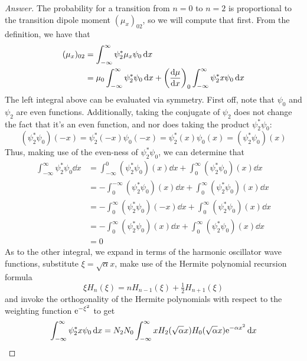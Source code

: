 \documentclass[../psets.tex]{subfiles}
\begin{document}
\begin{enumerate}
\begin{enumerate}
\begin{proof}[Answer]
            The probability for a transition from $n=0$ to $n=2$ is proportional to the transition dipole moment $(\mu_x)_{02}$, so we will compute that first. From the definition, we have that
            \begin{align*}
                (\mu_x)_{02} &= \int_{-\infty}^\infty\psi_2^*\mu_x\psi_0\dd{x}\\
                &= \mu_0\int_{-\infty}^\infty\psi_2^*\psi_0\dd{x}+\left( \dv{\mu}{x} \right)_0\int_{-\infty}^\infty\psi_2^*x\psi_0\dd{x}
            \end{align*}
            The left integral above can be evaluated via symmetry. First off, note that $\psi_0$ and $\psi_2$ are even functions. Additionally, taking the conjugate of $\psi_2$ does not change the fact that it's an even function, and nor does taking the product $\psi_2^*\psi_0$:
            \begin{equation*}
                (\psi_2^*\psi_0)(-x) = \psi_2^*(-x)\psi_0(-x)
                = \psi_2^*(x)\psi_0(x) = (\psi_2^*\psi_0)(x)
            \end{equation*}
            Thus, making use of the even-ness of $\psi_2^*\psi_0$, we can determine that
            \begin{align*}
                \int_{-\infty}^\infty\psi_2^*\psi_0\dd{x} &= \int_{-\infty}^0(\psi_2^*\psi_0)(x)\dd{x}+\int_0^\infty(\psi_2^*\psi_0)(x)\dd{x}\\
                &= -\int_0^{-\infty}(\psi_2^*\psi_0)(x)\dd{x}+\int_0^\infty(\psi_2^*\psi_0)(x)\dd{x}\\
                &= -\int_0^\infty(\psi_2^*\psi_0)(-x)\dd{x}+\int_0^\infty(\psi_2^*\psi_0)(x)\dd{x}\\
                &= -\int_0^\infty(\psi_2^*\psi_0)(x)\dd{x}+\int_0^\infty(\psi_2^*\psi_0)(x)\dd{x}\\
                &= 0
            \end{align*}
            As to the other integral, we expand in terms of the harmonic oscillator wave functions, substitute $\xi=\sqrt{\alpha}x$, make use of the Hermite polynomial recursion formula
            \begin{equation*}
                \xi H_n(\xi) = nH_{n-1}(\xi)+\tfrac{1}{2}H_{n+1}(\xi)
            \end{equation*}
            and invoke the orthogonality of the Hermite polynomials with respect to the weighting function $\e[-\xi^2]$ to get
            \begin{align*}
                \int_{-\infty}^\infty\psi_2^*x\psi_0\dd{x} &= N_2N_0\int_{-\infty}^\infty xH_2(\sqrt{\alpha}x)H_0(\sqrt{\alpha}x)\e[-\alpha x^2]\dd{x}\\

\end{align*}
\end{proof}
\end{enumerate}
\end{enumerate}
\end{document}
